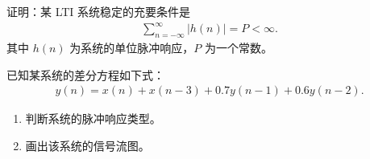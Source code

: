 \begin{exercise}
    \label{exercise:LTI-stable}
    证明：某 LTI 系统稳定的充要条件是
    \begin{align*}
        \sum_{n = -\infty}^{\infty} |h(n)| = P < \infty.
    \end{align*}
    其中 $h(n)$ 为系统的单位脉冲响应，$P$ 为一个常数。
\end{exercise}

\begin{exercise}
    已知某系统的差分方程如下式：
    \begin{align*}
        y(n) = x(n) + x(n - 3) + 0.7y(n - 1) + 0.6y(n - 2).
    \end{align*}
    \begin{enumerate}[label=(\arabic*)]
        \item 判断系统的脉冲响应类型。
        \item 画出该系统的信号流图。
    \end{enumerate}
\end{exercise}

